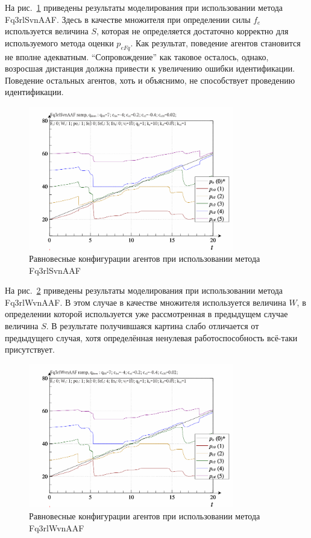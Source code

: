 На рис.~\ref{atu:f:qls_ramp_Fq3rlSvnAAF} приведены результаты моделирования
при использовании метода Fq3rlSvnAAF.
Здесь в качестве множителя при определении силы $f_e$ используется
величина $S$, которая не определяется достаточно корректно
для используемого метода оценки $p_{eFq}$. Как результат,
поведение агентов становится не вполне адекватным.
``Сопровождение'' как таковое осталось, однако,
возросшая дистанция должна привести к увеличению ошибки идентификации.
Поведение остальных агентов, хоть и объяснимо, не способствует
проведению идентификации.

\begin{figure}[htb!]
  \centerline{
    \includegraphics[width=0.8\textwidth]{p/ramp/qls-p_t_pi_Fq3rlSvnAAF_ramp.png}
  }
  \caption{Равновесные конфигурации агентов при использовании метода Fq3rlSvnAAF}
  \label{atu:f:qls_ramp_Fq3rlSvnAAF}
\end{figure}


На рис.~\ref{atu:f:qls_ramp_Fq3rlWvnAAF} приведены результаты моделирования
при использовании метода Fq3rlWvnAAF.
В этом случае в качестве множителя используется величина $W$,
в определении которой используется уже рассмотренная в предыдущем случае величина $S$.
В результате получившаяся картина слабо отличается от предыдущего случая,
хотя определённая ненулевая работоспособность всё-таки присутствует.

\begin{figure}[htb!]
  \centerline{
    \includegraphics[width=0.8\textwidth]{p/ramp/qls-p_t_pi_Fq3rlWvnAAF_ramp.png}
  }
  \caption{Равновесные конфигурации агентов при использовании метода Fq3rlWvnAAF}
  \label{atu:f:qls_ramp_Fq3rlWvnAAF}
\end{figure}

